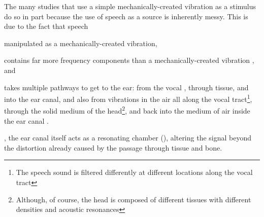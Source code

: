 The many studies that use a simple mechanically-created vibration as a stimulus do so in part because the use of speech as a source is inherently messy.  This is due to the fact that speech 
\DIFdelbegin {}\DIFdelend \begin{enumerate*}[label={\alph*)}]
  \item  \DIFdelbegin {}\DIFdelend \DIFaddbegin {}\DIFaddend manipulated as a \DIFdelbegin {}\DIFdelend mechanically-created vibration,
  \item  contains far more frequency components than a \DIFdelbegin {}\DIFdelend mechanically-created vibration \DIFaddbegin {}\DIFaddend , and 
  \item  takes multiple pathways to get to the ear: from the vocal \DIFdelbegin {}\DIFdelend \DIFaddbegin {}\DIFaddend , through tissue, and into the ear canal, and also from vibrations in the air all along the vocal tract\footnote{The speech sound is filtered differently at different locations along the vocal tract}, through the solid medium of the head\footnote{Although, of course, the head is composed of different tissues with different densities and acoustic resonances}, and back into the medium of air inside the ear canal \DIFaddbegin {}\DIFaddend .
\end{enumerate*}
% 
%
\DIFdelbegin {}\DIFdelend \DIFaddbegin {}\DIFaddend , the ear canal itself acts as a resonating chamber (\cite{rosen:91}), altering the signal beyond the distortion already caused by the passage through tissue and bone.  


